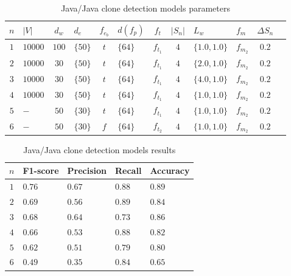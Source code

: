 %
\begin{table}
  \caption{\label{tab:java-java-model-params}Java/Java clone detection
    models parameters}
  \begin{center}
    \begin{tabularx}{\linewidth}{c Y c Y c Y c c Y Y c c}
      \toprule
      $n$ & $|V|$ & $d_w$ & $d_e$ & $f_{e_b}$ & $d(f_p)$ & $f_t$ & $|S_n|$ & $L_w$ & $f_m$ & $\Delta S_n$\\
      \toprule
      $1$ & $10000$ & $100$ & $\{50\}$ & $t$ & $\{64\}$ & $f_{t_1}$ & $4$ & $\{1.0,1.0\}$ & $f_{m_2}$ & $0.2$\\
      $2$ & $10000$ & $30$ & $\{50\}$ & $t$ & $\{64\}$ & $f_{t_1}$ & $4$ & $\{2.0,1.0\}$ & $f_{m_2}$ & $0.2$\\
      $3$ & $10000$ & $30$ & $\{50\}$ & $t$ & $\{64\}$ & $f_{t_1}$ & $4$ & $\{4.0,1.0\}$ & $f_{m_2}$ & $0.2$\\
      $4$ & $10000$ & $30$ & $\{50\}$ & $t$ & $\{64\}$ & $f_{t_1}$ & $4$ & $\{1.0,1.0\}$ & $f_{m_2}$ & $0.2$\\
      $5$ & $-$ & $50$ & $\{30\}$ & $t$ & $\{64\}$ & $f_{t_1}$ & $4$ & $\{1.0,1.0\}$ & $f_{m_2}$ & $0.2$\\
      $6$ & $-$ & $50$ & $\{30\}$ & $f$ & $\{64\}$ & $f_{t_2}$ & $4$ & $\{1.0,1.0\}$ & $f_{m_2}$ & $0.2$\\
      \bottomrule
    \end{tabularx}
  \end{center}
\end{table}
%
\begin{table}
  \caption{\label{tab:java-java-model-results}Java/Java clone detection
    models results}
  \begin{center}
    \begin{tabularx}{\linewidth}{c Y Y Y Y}
      \toprule
      $n$ & F1-score & Precision & Recall & Accuracy\\
      \toprule
      $1$ & $0.76$ & $0.67$ & $0.88$ & $0.89$\\
      $2$ & $0.69$ & $0.56$ & $0.89$ & $0.84$\\
      $3$ & $0.68$ & $0.64$ & $0.73$ & $0.86$\\
      $4$ & $0.66$ & $0.53$ & $0.88$ & $0.82$\\
      $5$ & $0.62$ & $0.51$ & $0.79$ & $0.80$\\
      $6$ & $0.49$ & $0.35$ & $0.84$ & $0.65$\\
      \bottomrule
    \end{tabularx}
  \end{center}
\end{table}
